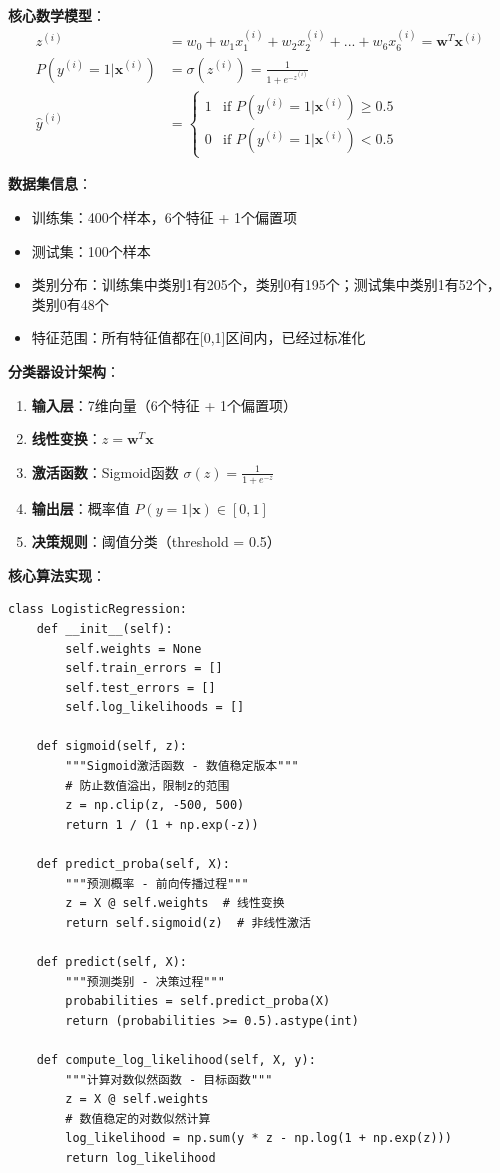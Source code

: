 \documentclass[a4paper]{article}
\begin{document}
\textbf{核心数学模型}：
\begin{align}
z^{(i)} &= w_0 + w_1 x_1^{(i)} + w_2 x_2^{(i)} + ... + w_6 x_6^{(i)} = \mathbf{w}^T \mathbf{x}^{(i)} \\
P(y^{(i)} = 1 | \mathbf{x}^{(i)}) &= \sigma(z^{(i)}) = \frac{1}{1 + e^{-z^{(i)}}} \\
\hat{y}^{(i)} &= \begin{cases} 1 & \text{if } P(y^{(i)} = 1 | \mathbf{x}^{(i)}) \geq 0.5 \\ 0 & \text{if } P(y^{(i)} = 1 | \mathbf{x}^{(i)}) < 0.5 \end{cases}
\end{align}

\textbf{数据集信息}：
\begin{itemize}
    \item 训练集：400个样本，6个特征 + 1个偏置项
    \item 测试集：100个样本
    \item 类别分布：训练集中类别1有205个，类别0有195个；测试集中类别1有52个，类别0有48个
    \item 特征范围：所有特征值都在[0,1]区间内，已经过标准化
\end{itemize}

\textbf{分类器设计架构}：
\begin{enumerate}
    \item \textbf{输入层}：7维向量（6个特征 + 1个偏置项）
    \item \textbf{线性变换}：$z = \mathbf{w}^T \mathbf{x}$
    \item \textbf{激活函数}：Sigmoid函数 $\sigma(z) = \frac{1}{1+e^{-z}}$
    \item \textbf{输出层}：概率值 $P(y=1|\mathbf{x}) \in [0,1]$
    \item \textbf{决策规则}：阈值分类（threshold = 0.5）
\end{enumerate}

\textbf{核心算法实现}：

\begin{lstlisting}[caption=逻辑回归核心组件实现]
class LogisticRegression:
    def __init__(self):
        self.weights = None
        self.train_errors = []
        self.test_errors = []
        self.log_likelihoods = []
    
    def sigmoid(self, z):
        """Sigmoid激活函数 - 数值稳定版本"""
        # 防止数值溢出，限制z的范围
        z = np.clip(z, -500, 500)
        return 1 / (1 + np.exp(-z))
    
    def predict_proba(self, X):
        """预测概率 - 前向传播过程"""
        z = X @ self.weights  # 线性变换
        return self.sigmoid(z)  # 非线性激活
    
    def predict(self, X):
        """预测类别 - 决策过程"""
        probabilities = self.predict_proba(X)
        return (probabilities >= 0.5).astype(int)
    
    def compute_log_likelihood(self, X, y):
        """计算对数似然函数 - 目标函数"""
        z = X @ self.weights
        # 数值稳定的对数似然计算
        log_likelihood = np.sum(y * z - np.log(1 + np.exp(z)))
        return log_likelihood
\end{lstlisting}
\end{document}
